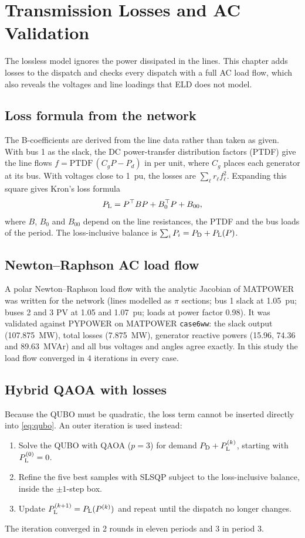 \chapter{Transmission Losses and AC Validation}

The lossless model ignores the power dissipated in the lines. This chapter adds losses to the dispatch and checks every dispatch with a full AC load flow, which also reveals the voltages and line loadings that ELD does not model.

\section{Loss formula from the network}
The B-coefficients are derived from the line data rather than taken as given. With bus 1 as the slack, the DC power-transfer distribution factors (PTDF) give the line flows $f = \mathrm{PTDF}\,(C_g P - P_d)$ in per unit, where $C_g$ places each generator at its bus. With voltages close to 1~pu, the losses are $\sum_\ell r_\ell f_\ell^2$. Expanding this square gives Kron's loss formula \cite{wood2014}
\begin{equation}
P_{\mathrm{L}} = P^\top B P + B_0^\top P + B_{00},
\end{equation}
where $B$, $B_0$ and $B_{00}$ depend on the line resistances, the PTDF and the bus loads of the period. The loss-inclusive balance is $\sum_i P_i = P_{\mathrm{D}} + P_{\mathrm{L}}(P)$.

\section{Newton--Raphson AC load flow}
A polar Newton--Raphson load flow with the analytic Jacobian of MATPOWER \cite{matpower2011} was written for the network (lines modelled as $\pi$ sections; bus 1 slack at 1.05~pu; buses 2 and 3 PV at 1.05 and 1.07~pu; loads at power factor 0.98). It was validated against PYPOWER on MATPOWER \texttt{case6ww}: the slack output (107.875~MW), total losses (7.875~MW), generator reactive powers (15.96, 74.36 and 89.63~MVAr) and all bus voltages and angles agree exactly. In this study the load flow converged in 4 iterations in every case.

\section{Hybrid QAOA with losses}
Because the QUBO must be quadratic, the loss term cannot be inserted directly into \eqref{eq:qubo}. An outer iteration is used instead:
\begin{enumerate}
\item Solve the QUBO with QAOA ($p = 3$) for demand $P_{\mathrm{D}} + P_{\mathrm{L}}^{(k)}$, starting with $P_{\mathrm{L}}^{(0)} = 0$.
\item Refine the five best samples with SLSQP subject to the loss-inclusive balance, inside the $\pm1$-step box.
\item Update $P_{\mathrm{L}}^{(k+1)} = P_{\mathrm{L}}(P^{(k)})$ and repeat until the dispatch no longer changes.
\end{enumerate}
The iteration converged in 2 rounds in eleven periods and 3 in period 3.

